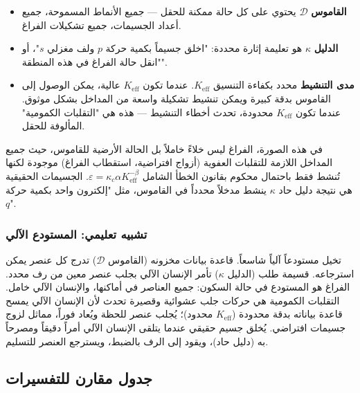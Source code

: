 \documentclass[12pt,a4paper]{article}
\theoremstyle{remark}
\begin{document}
	\begin{itemize}[leftmargin=*]
		\item \textbf{القاموس} \(\mathcal{D}\) يحتوي على كل حالة ممكنة للحقل — جميع الأنماط المسموحة، جميع أعداد الجسيمات، جميع تشكيلات الفراغ.
		\item \textbf{الدليل} \(\kappa\) هو تعليمة إثارة محددة: "اخلق جسيماً بكمية حركة \(p\) ولف مغزلي \(s\)"، أو "انقل حالة الفراغ في هذه المنطقة".
		\item \textbf{مدى التنشيط} محدد بكفاءة التنسيق \(K_{\mathrm{eff}}\). عندما تكون \(K_{\mathrm{eff}}\) عالية، يمكن الوصول إلى القاموس بدقة كبيرة ويمكن تنشيط تشكيلة واسعة من المداخل بشكل موثوق. عندما تكون \(K_{\mathrm{eff}}\) محدودة، تحدث أخطاء التنشيط — هذه هي "التقلبات الكمومية" المألوفة للحقل.
	\end{itemize}
	
	في هذه الصورة، الفراغ ليس خلاءً خاملاً بل الحالة الأرضية للقاموس، حيث جميع المداخل اللازمة للتقلبات العفوية (أزواج افتراضية، استقطاب الفراغ) موجودة لكنها تُنشط فقط باحتمال محكوم بقانون الخطأ الشامل \(\varepsilon = \kappa_c \alpha K_{\mathrm{eff}}^{-\beta}\). الجسيمات الحقيقية هي نتيجة دليل حاد \(\kappa\) ينشط مدخلاً محدداً في القاموس، مثل "إلكترون واحد بكمية حركة \(q\)".
	
	\subsubsection{تشبيه تعليمي: المستودع الآلي}
	
	تخيل مستودعاً آلياً شاسعاً. قاعدة بيانات مخزونه (القاموس \(\mathcal{D}\)) تدرج كل عنصر يمكن استرجاعه. قسيمة طلب (الدليل \(\kappa\)) تأمر الإنسان الآلي بجلب عنصر معين من رف محدد. الفراغ هو المستودع في حالة السكون: جميع العناصر في أماكنها، والإنسان الآلي خامل. التقلبات الكمومية هي حركات جلب عشوائية وقصيرة تحدث لأن الإنسان الآلي يمسح قاعدة بياناته بدقة محدودة (\(K_{\mathrm{eff}}\) محدود)؛ يُجلب عنصر للحظة ويُعاد فوراً، مماثل لزوج جسيمات افتراضي. يُخلق جسيم حقيقي عندما يتلقى الإنسان الآلي أمراً دقيقاً ومصرحاً به (دليل حاد)، ويقود إلى الرف بالضبط، ويسترجع العنصر للتسليم.
	
	\medskip
	
	\subsection{جدول مقارن للتفسيرات}
	
\end{document}
